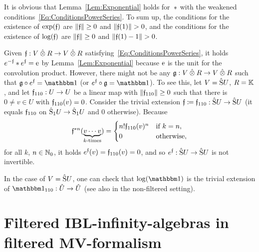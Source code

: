 \documentclass[\MainFolder/Text.tex]{subfiles}
\begin{document}
\begin{Remark}\label{Rem:ExpLogStar}
\begin{RemarkList}
\item It is obvious that Lemma~\ref{Lem:Exponential} holds for~$*$ with the weakened conditions~\eqref{Eq:ConditionsPowerSeries}. To sum up, the conditions for the existence of $\exp(\mathfrak{f})$ are $\| \mathfrak{f} \|\ge 0$ and $\Norm{\MVMorF(1)}>0$, and the conditions for the existence of $\log(\mathfrak{f})$ are $\| \mathfrak{f} \|\ge 0$ and $\Norm{\MVMorF(1) - 1}>0$.

\item Given $\MVMorF: V\COtimes R \rightarrow V\COtimes R$ satisfying~\eqref{Eq:ConditionsPowerSeries}, it holds $e^{-\mathfrak{f}}* e^{\mathfrak{f}} = \mathrm{e}$ by Lemma~\ref{Lem:Exponential} because $\mathrm{e}$ is the unit for the convolution product. However, there might not be any $\MVMorG: V\COtimes R \rightarrow V\COtimes R$ such that $\MVMorG \circ e^{\MVMorF} = \Id$ (or $e^{\MVMorF}\circ\MVMorG = \Id$). To see this, let $V=\hat{\mathrm{S}} U$, $R=\mathbb{K}$, and let $\mathfrak{f}_{110}: U \rightarrow U$ be a linear map with $\| \mathfrak{f}_{110} \|\ge 0$ such that there is $0 \neq v\in U$ with $\mathfrak{f}_{110}(v)=0$. Consider the trivial extension $\mathfrak{f}\coloneqq \mathfrak{f}_{110}: \hat{\mathrm{S}}U\rightarrow\hat{\mathrm{S}}U$ (it equals $\mathfrak{f}_{110}$ on $\hat{\mathrm{S}}_1 U\rightarrow \hat{\mathrm{S}}_1 U$ and $0$ otherwise). Because
\[ \mathfrak{f}^{* n}(\underbrace{v \dotsb v}_{k\text{-times}}) = \begin{cases}
 n! \mathfrak{f}_{110}(v)^n & \text{if } k = n, \\
 0 & \text{otherwise},
\end{cases}\]
for all $k$, $n\in\mathbb{N}_0$, it holds $e^{\mathfrak{f}}(v) = \mathfrak{f}_{110}(v) = 0$, and so $e^{\mathfrak{f}}: \hat{\mathrm{S}}U\rightarrow \hat{\mathrm{S}}U$ is not invertible.

\item In the case of $V=\hat{\mathrm{S}}U$, one can check that $\log(\Id)$ is the trivial extension of $\Id_{110}: \hat{U}\rightarrow \hat{U}$ (see also \cite[Example~21]{Markl2015} in the non-filtered setting).\qedhere
\end{RemarkList}
\end{Remark}


\section{Filtered IBL-infinity-algebras in filtered MV-formalism}\label{Sec:FilteredMV}
\end{document}
